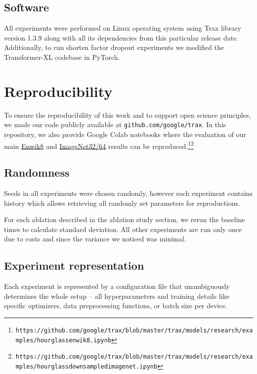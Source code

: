 \documentclass[11pt]{article}
\begin{document}
\subsection{Software}
All experiments were performed on Linux operating system using Trax library version 1.3.9 along with all its dependencies from this particular release date. Additionally, to run shorten factor dropout experiments we modified the Transformer-XL codebase in PyTorch.



\section{Reproducibility}
To ensure the reproducibility of this work and to support open science principles, we made our code publicly available at \texttt{github.com/google/trax}. In this repository, we also provide Google Colab notebooks where the evaluation of our main \href{https://colab.research.google.com/github/google/trax/blob/master/trax/models/research/examples/hourglass_enwik8.ipynb}{Enwik8} and \href{https://colab.research.google.com/github/google/trax/blob/master/trax/models/research/examples/hourglass_downsampled_imagenet.ipynb}{ImageNet32/64} results can be reproduced.\footnote{\texttt{https://github.com/google/trax/blob/master/trax/models/research/examples/hourglass\textunderscore enwik8.ipynb}}\footnote{\texttt{https://github.com/google/trax/blob/master/trax/models/research/examples/hourglass\textunderscore downsampled\textunderscore imagenet.ipynb}} 

\subsection{Randomness}
Seeds in all experiments were chosen randomly, however each experiment contains history which allows retrieving all randomly set parameters for reproductions. 

For each ablation described in the ablation study section, we rerun the baseline  times to calculate standard deviation. All other experiments are run only once due to costs and since the variance we noticed was minimal.

\subsection{Experiment representation}
Each experiment is represented by a configuration file that unambiguously determines the whole setup -- all hyperparameters and training details like specific optimizers, data preprocessing functions, or batch size per device.
\end{document}
